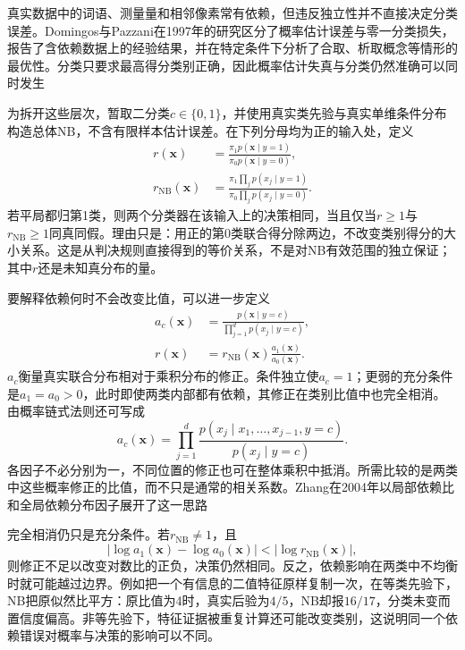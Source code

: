 真实数据中的词语、测量量和相邻像素常有依赖，但违反独立性并不直接决定分类误差。Domingos与Pazzani在1997年的研究区分了概率估计误差与零一分类损失，报告了含依赖数据上的经验结果，并在特定条件下分析了合取、析取概念等情形的最优性。分类只要求最高得分类别正确，因此概率估计失真与分类仍然准确可以同时发生

为拆开这些层次，暂取二分类$c\in\{0,1\}$，并使用真实类先验与真实单维条件分布构造总体NB，不含有限样本估计误差。在下列分母均为正的输入处，定义
\begin{equation}
  \label{eq:classification-naive-bayes-ratios}
  \begin{aligned}
    r(\bm{x})
      &=\frac{\pi_1p(\bm{x}\mid y=1)}
              {\pi_0p(\bm{x}\mid y=0)},\\
    r_{\mathrm{NB}}(\bm{x})
      &=\frac{\pi_1\prod_jp(x_j\mid y=1)}
              {\pi_0\prod_jp(x_j\mid y=0)}.
  \end{aligned}
\end{equation}
若平局都归第1类，则两个分类器在该输入上的决策相同，当且仅当$r\geq1$与$r_{\mathrm{NB}}\geq1$同真同假。理由只是：用正的第0类联合得分除两边，不改变类别得分的大小关系。这是从判决规则直接得到的等价关系，不是对NB有效范围的独立保证；其中$r$还是未知真分布的量。

要解释依赖何时不会改变比值，可以进一步定义
\begin{equation}
  \label{eq:classification-naive-bayes-dependence}
  \begin{aligned}
    a_c(\bm{x})
      &=\frac{p(\bm{x}\mid y=c)}
              {\prod_{j=1}^{d}p(x_j\mid y=c)},\\
    r(\bm{x})
      &=r_{\mathrm{NB}}(\bm{x})
        \frac{a_1(\bm{x})}{a_0(\bm{x})}.
  \end{aligned}
\end{equation}
$a_c$衡量真实联合分布相对于乘积分布的修正。条件独立使$a_c=1$；更弱的充分条件是$a_1=a_0>0$，此时即使两类内部都有依赖，其修正在类别比值中也完全相消。由概率链式法则还可写成
\[
  a_c(\bm{x})
  =\prod_{j=1}^{d}
    \frac{p(x_j\mid x_1,\ldots,x_{j-1},y=c)}
         {p(x_j\mid y=c)}.
\]
各因子不必分别为一，不同位置的修正也可在整体乘积中抵消。所需比较的是两类中这些概率修正的比值，而不只是通常的相关系数。Zhang在2004年以局部依赖比和全局依赖分布因子展开了这一思路

完全相消仍只是充分条件。若$r_{\mathrm{NB}}\neq1$，且
\[
  \left|\log a_1(\bm{x})-\log a_0(\bm{x})\right|
  <\left|\log r_{\mathrm{NB}}(\bm{x})\right|,
\]
则修正不足以改变对数比的正负，决策仍然相同。反之，依赖影响在两类中不均衡时就可能越过边界。例如把一个有信息的二值特征原样复制一次，在等类先验下，NB把原似然比平方：原比值为4时，真实后验为$4/5$，NB却报$16/17$，分类未变而置信度偏高。非等先验下，特征证据被重复计算还可能改变类别，这说明同一个依赖错误对概率与决策的影响可以不同。

